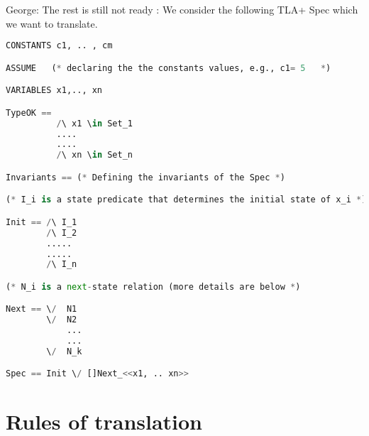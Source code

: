 \documentclass{article}
\newlength{\MMtextNodeWidth}
\newcommand{\MMsetTextNodeWidth}[1]{%
  \settowidth{\MMtextNodeWidth}{#1}%
}
\theoremstyle{plain}
\numberwithin{equation}{section}
\newcommand{\george}[1]{\textcolor{brown}{\textsc{George: } {\sf #1}}}
\begin{document}
\iffalse  

\large
\MMsetTextNodeWidth{99}

\george{Illustration of the grammar of the file $Trans\_Input\_Gram.tla$. Not ready yet}



   \begin{tikzpicture}
      [sibling distance=10em,level distance=6em,
      every node/.style={shape=rectangle,draw,align=center}]
\node{Spech}
   child{node{Init}
      child{node{Simple$\_$Propositional}
        child{node{Identifier }}}}
   child{node{Next }
      child{node{Next$\_$State$\_$Exp)}}};


   \end{tikzpicture}

\fi   



\iffalse    




\color{red} George: The rest is still not ready : 
We consider the following TLA+ Spec which we want to translate.

\begin{lstlisting}[language=Python]
CONSTANTS c1, .. , cm

ASSUME   (* declaring the the constants values, e.g., c1= 5   *)  

VARIABLES x1,.., xn

TypeOK == 
          /\ x1 \in Set_1
          ....
          ....
          /\ xn \in Set_n

Invariants == (* Defining the invariants of the Spec *)           

(* I_i is a state predicate that determines the initial state of x_i *)

Init == /\ I_1    
        /\ I_2 
        .....
        .....
        /\ I_n 

(* N_i is a next-state relation (more details are below *)

Next == \/  N1 
        \/  N2 
            ...
            ...
        \/  N_k 

Spec == Init \/ []Next_<<x1, .. xn>>        
\end{lstlisting}
 

\section*{Rules of translation}

 

\end{document}
